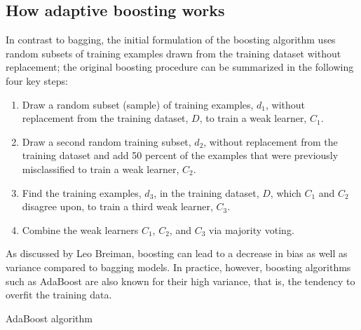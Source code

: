 \subsection{How adaptive boosting works}
In contrast to bagging, the initial formulation of the boosting algorithm uses random subsets of training examples drawn from the training dataset without replacement; the original boosting procedure can be summarized in the following four key steps:
\begin{enumerate}
    \item Draw a random subset (sample) of training examples, $d_1$, without replacement from the training dataset, $D$, to train a weak learner, $C_1$.
    \item Draw a second random training subset, $d_2$, without replacement from the training dataset and add 50 percent of the examples that were previously misclassified to train a weak learner, $C_2$.
    \item Find the training examples, $d_3$, in the training dataset, $D$, which $C_1$ and $C_2$ disagree upon, to train a third weak learner, $C_3$.
    \item Combine the weak learners $C_1$, $C_2$, and $C_3$ via majority voting.
\end{enumerate}

As discussed by Leo Breiman, boosting can lead to a decrease in bias as well as variance compared to bagging models. In practice, however, boosting algorithms such as AdaBoost are also known for their high variance, that is, the tendency to overfit the training data.


\begin{algorithm}
    \caption{AdaBoost algorithm}
\end{algorithm}